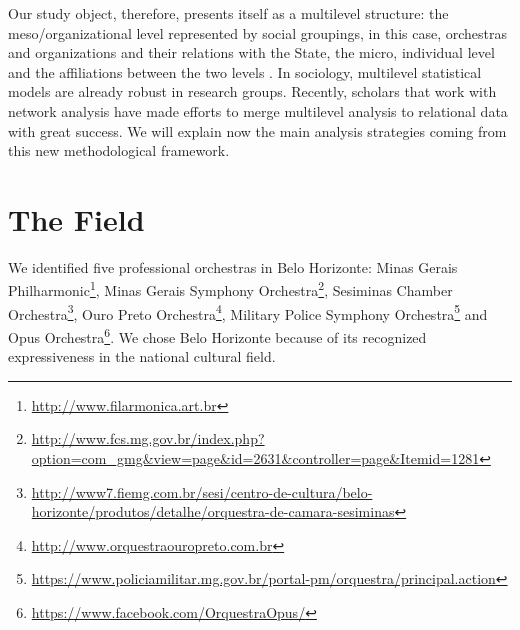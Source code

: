 \documentclass[a4paper, 12pt, openright, oneside, german, french, brazil, english]{abntex2}
\begin{document}
	Our study object, therefore, presents itself as a multilevel structure: the meso/organizational level represented by social groupings, in this case, orchestras and organizations and their relations with the State, the micro, individual level and the affiliations between the two levels \cite{brailly2016market,eloire2009reseaux,lazega2008catching,favre2016inter,lazega2016synchronization}. In sociology, multilevel statistical models are already robust in research groups. Recently, scholars that work with network analysis have made efforts to merge multilevel analysis to relational data with great success. We will explain now the main analysis strategies coming from this new methodological framework.
	
	

        
	\chapter{The Field}
	
	
	
	We identified five professional orchestras in Belo Horizonte: Minas Gerais Philharmonic\footnote{\url{http://www.filarmonica.art.br}}, Minas Gerais Symphony Orchestra\footnote{\url{http://www.fcs.mg.gov.br/index.php?option=com_gmg&view=page&id=2631&controller=page&Itemid=1281}}, Sesiminas Chamber Orchestra\footnote{\url{http://www7.fiemg.com.br/sesi/centro-de-cultura/belo-horizonte/produtos/detalhe/orquestra-de-camara-sesiminas}}, Ouro Preto Orchestra\footnote{\url{http://www.orquestraouropreto.com.br}}, Military Police Symphony Orchestra\footnote{\url{https://www.policiamilitar.mg.gov.br/portal-pm/orquestra/principal.action}} and Opus Orchestra\footnote{\url{https://www.facebook.com/OrquestraOpus/}}. We chose	Belo Horizonte because of its recognized expressiveness in the national cultural field.
	
	
\end{document}
